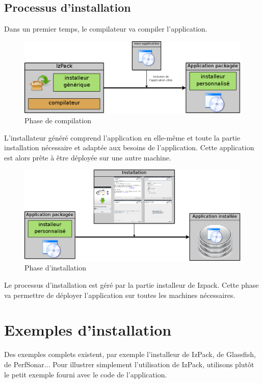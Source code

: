 \subsection{Processus d'installation}
Dans un premier temps, le compilateur va compiler l'application.



\begin{figure}[H]
	\centering
	\includegraphics[width=\textwidth]{../image/partie_compil.png}
	\caption{Phase de compilation}
\end{figure}
L'installateur généré comprend l'application en elle-même et toute la partie installation nécessaire et adaptée aux besoins de l'application.
Cette application est alors prête à être déployée sur une autre machine.
\begin{figure}[H]
	\centering
	\includegraphics[width=\textwidth]{../image/partie_install.png}
	\caption{Phase d'installation}
\end{figure}
Le processus d'installation est géré par la partie installeur de Izpack. Cette phase va permettre de déployer l'application sur toutes les machines nécessaires.

\section{Exemples d'installation}
Des exemples complets existent, par exemple l'installeur de IzPack, de Glassfish, de PerfSonar... 
Pour illustrer simplement l'utilisation de IzPack, utilisons plutôt le petit exemple fourni avec le code de l'application.
